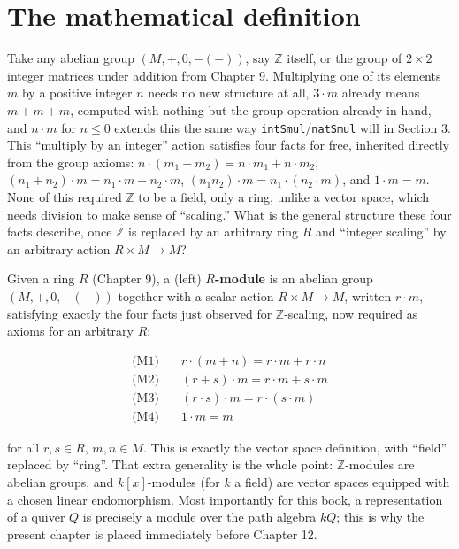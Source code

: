 \section{The mathematical definition}\label{sec:11-modules:01-definition:1}

Take any abelian group \((M, +, 0, -(-))\), say \(\mathbb{Z}\) itself, or the group of \(2\times 2\) integer matrices under addition from Chapter 9. Multiplying one of its elements \(m\) by a positive integer \(n\) needs no new structure at all, \(3 \cdot m\) already means \(m + m + m\), computed with nothing but the group operation already in hand, and \(n \cdot m\) for \(n \le 0\) extends this the same way \texttt{intSmul}/\texttt{natSmul} will in Section 3. This ``multiply by an integer'' action satisfies four facts for free, inherited directly from the group axioms: \(n \cdot (m_1 + m_2) = n\cdot m_1 + n \cdot m_2\), \((n_1+n_2)\cdot m = n_1\cdot m + n_2 \cdot m\), \((n_1 n_2)\cdot m =
n_1\cdot(n_2\cdot m)\), and \(1 \cdot m = m\). None of this required \(\mathbb{Z}\) to be a field, only a ring, unlike a vector space, which needs division to make sense of ``scaling.'' What is the general structure these four facts describe, once \(\mathbb{Z}\) is replaced by an arbitrary ring \(R\) and ``integer scaling'' by an arbitrary action \(R \times M \to M\)?

Given a ring \(R\) (Chapter 9), a (left) \textbf{\(R\)-module} is an abelian group \((M, +, 0, -(-))\) together with a scalar action \(R \times M \to M\), written \(r \cdot m\), satisfying exactly the four facts just observed for \(\mathbb{Z}\)-scaling, now required as axioms for an arbitrary \(R\):

\[
\begin{aligned}
\text{(M1)}&\quad r \cdot (m + n) = r\cdot m + r \cdot n \\
\text{(M2)}&\quad (r + s) \cdot m = r \cdot m + s \cdot m \\
\text{(M3)}&\quad (r \cdot s) \cdot m = r \cdot (s \cdot m) \\
\text{(M4)}&\quad 1 \cdot m = m
\end{aligned}
\]

for all \(r, s \in R\), \(m, n \in M\). This is exactly the vector space definition, with ``field'' replaced by ``ring''. That extra generality is the whole point: \(\mathbb{Z}\)-modules are abelian groups, and \(k[x]\)-modules (for \(k\) a field) are vector spaces equipped with a chosen linear endomorphism. Most importantly for this book, a representation of a quiver \(Q\) is precisely a module over the path algebra \(kQ\); this is why the present chapter is placed immediately before Chapter 12.

